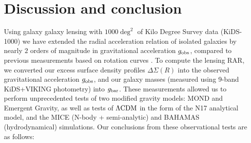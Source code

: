 \documentclass[usenatbib]{mnras}
\newcommand{\lcdm}{{\rm \Lambda CDM}}
\newcommand{\un}[1]{_{\rm #1}}
\begin{document}
\section{Discussion and conclusion}
\label{sec:discon}

Using galaxy galaxy lensing with $1000 \deg^2$ of Kilo Degree Survey data (KiDS-1000) we have extended the radial acceleration relation of isolated galaxies by nearly $2$ orders of magnitude in gravitational acceleration $g\un{obs}$, compared to previous measurements based on rotation curves \cite[most notably][M16]{mcgaugh2016}. To compute the lensing RAR, we converted our excess surface density profiles $\Delta\Sigma(R)$ into the observed gravitational acceleration $g\un{obs}$, and our galaxy masses (measured using 9-band KiDS+VIKING photometry) into $g\un{bar}$. These measurements allowed us to perform unprecedented tests of two modified gravity models: MOND and Emergent Gravity, as well as tests of $\lcdm$ in the form of the N17 analytical model, and the MICE (N-body + semi-analytic) and BAHAMAS (hydrodynamical) simulations. Our conclusions from these observational tests are as follows:
\end{document}

